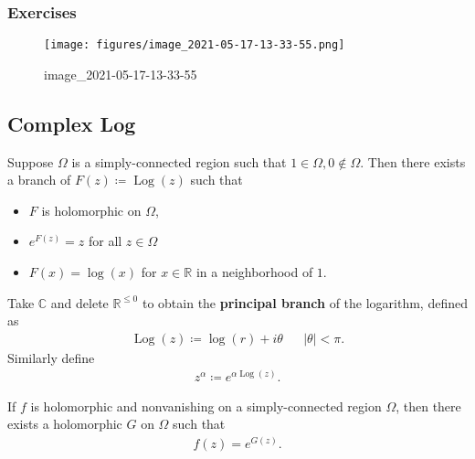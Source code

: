 \hypertarget{exercises-3}{%
\subsubsection{Exercises}\label{exercises-3}}

\begin{figure}
\centering
\texttt{[image: figures/image\_2021-05-17-13-33-55.png]}
\caption{image\_2021-05-17-13-33-55}
\end{figure}

\hypertarget{complex-log}{%
\subsection{Complex Log}\label{complex-log}}

\begin{proposition}

Suppose \(\Omega\) is a simply-connected region such that
\(1\in \Omega, 0\not\in\Omega\). Then there exists a branch of
\(F(z) \coloneqq\operatorname{Log}(z)\) such that

\begin{itemize}
\tightlist
\item
  \(F\) is holomorphic on \(\Omega\),
\item
  \(e^{F(z)} = z\) for all \(z\in \Omega\)
\item
  \(F(x) = \log(x)\) for \(x\in {\mathbb{R}}\) in a neighborhood of
  \(1\).
\end{itemize}

\end{proposition}

\begin{definition}

Take \({\mathbb{C}}\) and delete \({\mathbb{R}}^{\leq 0}\) to obtain the
\textbf{principal branch} of the logarithm, defined as
\begin{align*}
\operatorname{Log}(z) \coloneqq\log(r) + i\theta && {\left\lvert {\theta} \right\rvert} < \pi
.\end{align*}
Similarly define
\begin{align*}
z^{\alpha} \coloneqq e^{\alpha \operatorname{Log}(z)}
.\end{align*}

\end{definition}

\begin{theorem}

If \(f\) is holomorphic and nonvanishing on a simply-connected region
\(\Omega\), then there exists a holomorphic \(G\) on \(\Omega\) such
that
\begin{align*}
f(z) = e^{G(z)}
.\end{align*}

\end{theorem}

